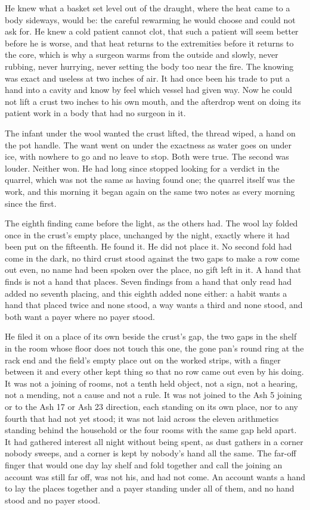 He knew what a basket set level out of the draught, where the heat came to a body sideways, would be: the careful rewarming he would choose and could not ask for. He knew a cold patient cannot clot, that such a patient will seem better before he is worse, and that heat returns to the extremities before it returns to the core, which is why a surgeon warms from the outside and slowly, never rubbing, never hurrying, never setting the body too near the fire. The knowing was exact and useless at two inches of air. It had once been his trade to put a hand into a cavity and know by feel which vessel had given way. Now he could not lift a crust two inches to his own mouth, and the afterdrop went on doing its patient work in a body that had no surgeon in it.

The infant under the wool wanted the crust lifted, the thread wiped, a hand on the pot handle. The want went on under the exactness as water goes on under ice, with nowhere to go and no leave to stop. Both were true. The second was louder. Neither won. He had long since stopped looking for a verdict in the quarrel, which was not the same as having found one; the quarrel itself was the work, and this morning it began again on the same two notes as every morning since the first.

\scenebreak

The eighth finding came before the light, as the others had. The wool lay folded once in the crust's empty place, unchanged by the night, exactly where it had been put on the fifteenth. He found it. He did not place it. No second fold had come in the dark, no third crust stood against the two gaps to make a row come out even, no name had been spoken over the place, no gift left in it. A hand that finds is not a hand that places. Seven findings from a hand that only read had added no seventh placing, and this eighth added none either: a habit wants a hand that placed twice and none stood, a way wants a third and none stood, and both want a payer where no payer stood.

He filed it on a place of its own beside the crust's gap, the two gaps in the shelf in the room whose floor does not touch this one, the gone pan's round ring at the rack end and the field's empty place out on the worked strips, with a finger between it and every other kept thing so that no row came out even by his doing. It was not a joining of rooms, not a tenth held object, not a sign, not a hearing, not a mending, not a cause and not a rule. It was not joined to the Ash 5 joining or to the Ash 17 or Ash 23 direction, each standing on its own place, nor to any fourth that had not yet stood; it was not laid across the eleven arithmetics standing behind the household or the four rooms with the same gap held apart. It had gathered interest all night without being spent, as dust gathers in a corner nobody sweeps, and a corner is kept by nobody's hand all the same. The far-off finger that would one day lay shelf and fold together and call the joining an account was still far off, was not his, and had not come. An account wants a hand to lay the places together and a payer standing under all of them, and no hand stood and no payer stood.

